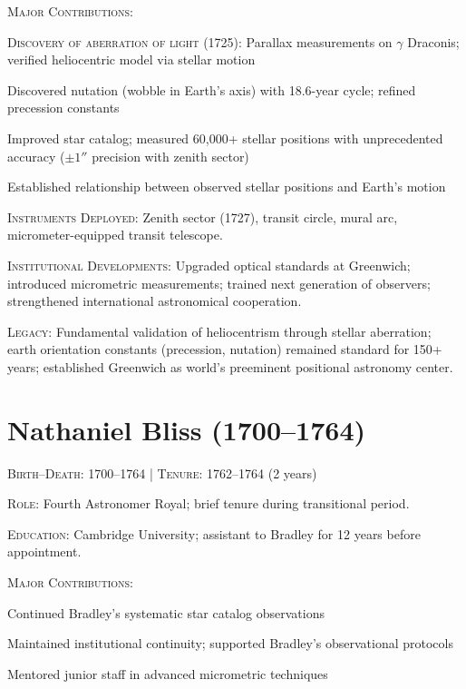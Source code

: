 \noindent\textsc{Major Contributions}:
\begin{enumerate*}[label=(\arabic*)]
\item \textsc{Discovery of aberration of light} (1725): Parallax measurements on $\gamma$ Draconis; verified heliocentric model via stellar motion
\item Discovered nutation (wobble in Earth's axis) with 18.6-year cycle; refined precession constants
\item Improved star catalog; measured 60,000+ stellar positions with unprecedented accuracy ($\pm 1''$ precision with zenith sector)
\item Established relationship between observed stellar positions and Earth's motion
\end{enumerate*}

\noindent\textsc{Instruments Deployed}: Zenith sector (1727), transit circle, mural arc, micrometer-equipped transit telescope.

\noindent\textsc{Institutional Developments}: Upgraded optical standards at Greenwich; introduced micrometric measurements; trained next generation of observers; strengthened international astronomical cooperation.

\noindent\textsc{Legacy}: Fundamental validation of heliocentrism through stellar aberration; earth orientation constants (precession, nutation) remained standard for 150+ years; established Greenwich as world's preeminent positional astronomy center.

\medskip

\section*{Nathaniel Bliss (1700--1764)}
\textsc{Birth--Death}: 1700--1764 | \textsc{Tenure}: 1762--1764 (2 years)

\noindent\textsc{Role}: Fourth Astronomer Royal; brief tenure during transitional period.

\noindent\textsc{Education}: Cambridge University; assistant to Bradley for 12 years before appointment.

\noindent\textsc{Major Contributions}:
\begin{enumerate*}[label=(\arabic*)]
\item Continued Bradley's systematic star catalog observations
\item Maintained institutional continuity; supported Bradley's observational protocols
\item Mentored junior staff in advanced micrometric techniques
\end{enumerate*}

